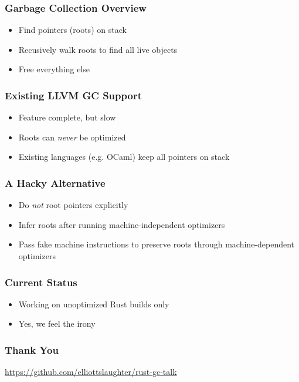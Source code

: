 \documentclass[ignorenonframetext,12pt]{beamer}
\begin{document}
\begin{frame}\frametitle{Garbage Collection Overview}
\begin{itemize}
  \item<alert@2> Find pointers (roots) on stack
  \item<alert@3> Recusively walk roots to find all live objects
  \item<alert@4> Free everything else
\end{itemize}
\end{frame}

\begin{frame}\frametitle{Existing LLVM GC Support}
\begin{itemize}
  \item Feature complete, but slow
  \item Roots can \emph{never} be optimized
  \item Existing languages (e.g. OCaml) keep all pointers on stack
\end{itemize}
\end{frame}

\begin{frame}\frametitle{A Hacky Alternative}
\begin{itemize}
  \item Do \emph{not} root pointers explicitly
  \item Infer roots after running machine-independent optimizers
  \item Pass fake machine instructions to preserve roots through machine-dependent optimizers
\end{itemize}
\end{frame}

\begin{frame}\frametitle{Current Status}
\begin{itemize}
  \item Working on unoptimized Rust builds only
  \item Yes, we feel the irony
\end{itemize}
\end{frame}

\begin{frame}\frametitle{Thank You}
\url{https://github.com/elliottslaughter/rust-gc-talk}
\end{frame}
\end{document}
